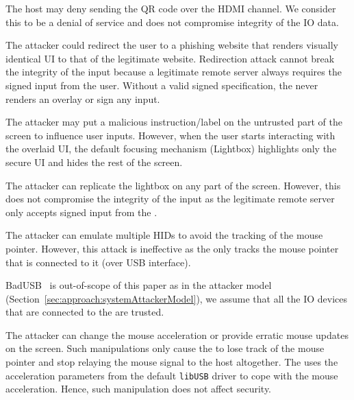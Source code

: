  The host may deny sending the QR code over the HDMI channel. We consider this to be a denial of service and does not compromise integrity of the IO data. 

 The attacker could redirect the user to a phishing website that renders visually identical UI to that of the legitimate website. Redirection attack cannot break the integrity of the input because a legitimate remote server always requires the signed input from the user. Without a valid signed specification, the \device never renders an overlay or sign any input. 

 The attacker may put a malicious instruction/label on the untrusted part of the screen to influence user inputs. However, when the user starts interacting with the overlaid UI, the default focusing mechanism (Lightbox) highlights only the secure UI and hides the rest of the screen. 

 The attacker can replicate the lightbox on any part of the screen. However, this does not compromise the integrity of the input as the legitimate remote server only accepts signed input from the \device. 

 The attacker can emulate multiple HIDs to avoid the tracking of the mouse pointer. However, this attack is ineffective as the \device only tracks the mouse pointer that is connected to it (over USB interface). 

 BadUSB~\cite{badUSB} is out-of-scope of this paper as in the attacker model (Section~\ref{sec:approach:systemAttackerModel}), we assume that all the IO devices that are connected to the \device are trusted.


 The attacker can change the mouse acceleration or provide erratic mouse updates on the screen. Such manipulations only cause the \device to lose track of the mouse pointer and stop relaying the mouse signal to the host altogether. The \device uses the acceleration parameters from the default \texttt{libUSB} driver to cope with the mouse acceleration. Hence, such manipulation does not affect security.

